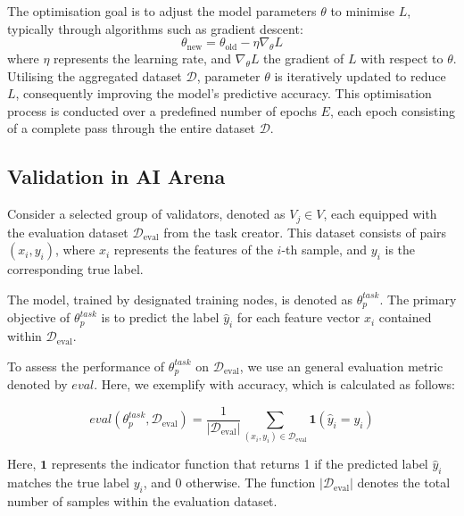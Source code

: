 \documentclass[conference]{IEEEtran}
\newcommand{\SNT}{{AI Arena}\xspace}
\begin{document}
The optimisation goal is to adjust the model parameters \(\theta\) to minimise \(L\), typically through algorithms such as  gradient descent:
\begin{equation*}
\theta_{\text{new}} = \theta_{\text{old}} - \eta \nabla_\theta L
\end{equation*}
where \(\eta\) represents the learning rate, and \(\nabla_\theta L\) the gradient of \(L\) with respect to \(\theta\). Utilising the aggregated dataset \(\mathcal{D}\), parameter \(\theta\) is iteratively updated to reduce \(L\), consequently improving the model's predictive accuracy. This optimisation process is conducted over a predefined number of epochs \(E\), each epoch consisting of a complete pass through the entire dataset \(\mathcal{D}\).








\subsection{Validation in \SNT}

Consider a selected group of validators, denoted as $V_j \in V$, each equipped with the evaluation dataset $\mathcal{D}_{\text{eval}}$ from the task creator. This dataset consists of pairs $(x_i, y_i)$, where $x_i$ represents the features of the $i$-th sample, and $y_i$ is the corresponding true label. 

The model, trained by designated training nodes, is denoted as $\theta^{task}_p$. The primary objective of $\theta^{task}_p$ is to predict the label $\hat{y}_i$ for each feature vector $x_i$ contained within $\mathcal{D}_{\text{eval}}$. 

To assess the performance of $\theta^{task}_p$ on $\mathcal{D}_{\text{eval}}$, we use an general evaluation metric denoted by $eval$. Here, we exemplify with accuracy, which is calculated as follows:

\begin{equation*}
eval(\theta^{task}_p, \mathcal{D}_{\text{eval}}) = \frac{1}{|\mathcal{D}_{\text{eval}}|} \sum_{(x_i, y_i) \in \mathcal{D}_{\text{eval}}} \mathbf{1}(\hat{y}_i = y_i)
\end{equation*}

Here, $\mathbf{1}$ represents the indicator function that returns 1 if the predicted label $\hat{y}_i$ matches the true label $y_i$, and 0 otherwise. The function $|\mathcal{D}_{\text{eval}}|$ denotes the total number of samples within the evaluation dataset.
\end{document}
